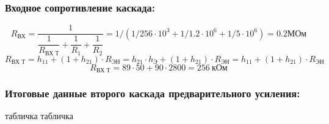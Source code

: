 \subsubsection{Входное сопротивление каскада:}
\begin{equation}
   \label{eq:equation6_21}
R_{\text{ВХ}}=\dfrac{1}{\dfrac{1}{R_\text{ВХ Т}}+\dfrac{1}{R_1}+\dfrac{1}{R_2}}=1/(1/256 \cdot 10^3 +1/1.2 \cdot 10^6 + 1/5 \cdot 10^6)=0.2\text{МОм}
\end{equation}
\begin{equation}
   \label{eq:equation6_22}
R_{\text{ВХ Т}}=h_{11}+(1+h_{21})\cdot R_{\text{ЭН}}=h_{21} \cdot h_{\text{Э}}+(1+h_{21}) \cdot R_{\text{ЭН}}=h_{11}+(1+h_{21}) \cdot R_{\text{ЭН}}
\end{equation}
\begin{equation*}
R_{\text{ВХ Т}}=89 \cdot 50+90 \cdot 2800 =256~\text{кОм}
\end{equation*}

\subsubsection{Итоговые данные второго каскада предварительного усиления:}
табличка
табличка

